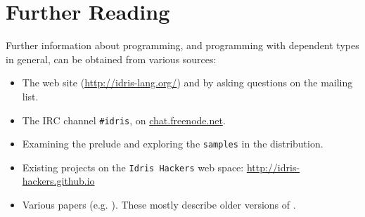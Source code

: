 \section{Further Reading}

Further information about \Idris{} programming, and programming with dependent
types in general, can be obtained from various sources:

\begin{itemize}
\item The \Idris{} web site (\url{http://idris-lang.org/}) and by asking questions on the mailing list.
\item The IRC channel \texttt{\#idris}, on \url{chat.freenode.net}.
\item Examining the prelude and exploring the \texttt{samples} in the distribution.
\item Existing projects on the \texttt{Idris Hackers} web space: \url{http://idris-hackers.github.io}
\item Various papers (e.g. \cite{plpv11, scrap-engine,res-dsl-padl12}).
These mostly describe older versions of \Idris{}.
\end{itemize}

